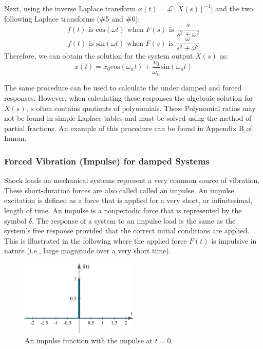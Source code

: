 \documentclass[12pt,letter]{article}
\numberwithin{ex}{section} %
\numberwithin{re}{section} %
\newcommand{\Laplace}[1]{\ensuremath{\mathcal{L}{\left[#1\right]}}}
\numberwithin{equation}{section}	%
\begin{document}
			Next, using the inverse Laplace transform $x(t) = \Laplace{X(s)}^{-1}]$ and the two following Laplace transforms (\#5 and \#6):
			\begin{equation}
			f(t) \text{ is cos}(\omega t) \text{ when }  F(s) \text{ is } \frac{s}{s^2+\omega^2} 
			\end{equation}
			\begin{equation}
			f(t) \text{ is sin}(\omega t)  \text{ when }  F(s) \text{ is } \frac{\omega}{s^2+\omega^2} 
			\end{equation}
			Therefore, we can obtain the solution for the system output $X(s)$ as:
			\begin{equation}
			x(t) = x_0 \text{cos}(\omega_n t) + \frac{v_0}{\omega_n}\text{sin}(\omega_n t)
			\end{equation}
			
			The same procedure can be used to calculate the under damped and forced responses. However, when calculating these responses the algebraic solution for $X(s)$, $s$ often contains quotients of polynomials. These Polynomial ratios may not be found in simple Laplace tables and must be solved using the method of partial fractions. An example of this procedure can be found in Appendix B of Inman. 

			\subsubsection{Forced Vibration (Impulse) for damped Systems}
		
			Shock loads on mechanical systems represent a very common source of vibration. These short-duration forces are also called called an impulse. An impulse excitation is defined as a force that is applied for a very short, or infinitesimal, length of time. An impulse is a nonperiodic force that is represented by the symbol $\delta$. The response of a system to an impulse load is the same as the system's free response provided that the correct initial conditions are applied. This is illustrated in the following where the applied force $F(t)$ is impulsive in nature (i.e., large magnitude over a very short time).
			
			\begin{figure}[H]
				\centering
				\includegraphics[width=0.5\textwidth]{../figures/unit_impulse.png}
				\caption{An impulse function with the impulse at $t=0$. }
			\end{figure}
			
\end{document}
